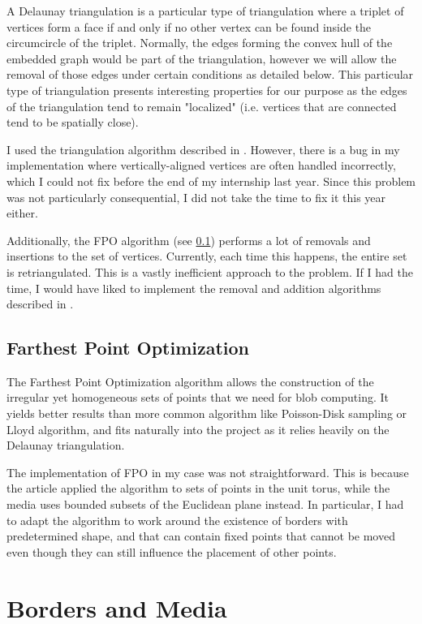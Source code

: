 \documentclass{article}
\begin{document}
A Delaunay triangulation is a particular type of triangulation where a triplet of vertices form a face if and only if no other vertex can be found inside the circumcircle of the triplet. Normally, the edges forming the convex hull of the embedded graph would be part of the triangulation, however we will allow the removal of those edges under certain conditions as detailed below. This particular type of triangulation presents interesting properties for our purpose as the edges of the triangulation tend to remain "localized" (i.e. vertices that are connected tend to be spatially close).

I used the triangulation algorithm described in \cite{build_delaunay}. However, there is a bug in my implementation where vertically-aligned vertices are often handled incorrectly, which I could not fix before the end of my internship last year. Since this problem was not particularly consequential, I did not take the time to fix it this year either.

Additionally, the FPO algorithm (see \ref{fpo}) performs a lot of removals and insertions to the set of vertices. Currently, each time this happens, the entire set is retriangulated. This is a vastly inefficient approach to the problem. If I had the time, I would have liked to implement the removal and addition algorithms described in \cite{build_delaunay, remove_delaunay}.

\subsection{Farthest Point Optimization}
\label{fpo}

The Farthest Point Optimization algorithm \supercite{FPO} allows the construction of the irregular yet homogeneous sets of points that we need for blob computing. It yields better results than more common algorithm like Poisson-Disk sampling or Lloyd algorithm, and fits naturally into the project as it relies heavily on the Delaunay triangulation.

The implementation of FPO in my case was not straightforward. This is because the article applied the algorithm to sets of points in the unit torus, while the media uses bounded subsets of the Euclidean plane instead. In particular, I had to adapt the algorithm to work around the existence of borders with predetermined shape, and that can contain fixed points that cannot be moved even though they can still influence the placement of other points.

\section{Borders and Media}
\end{document}
